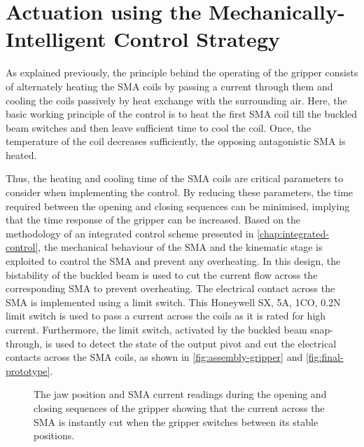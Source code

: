 \section{Actuation using the Mechanically-Intelligent Control Strategy}
As explained previously, the principle behind the operating of the gripper consists of alternately heating the SMA coils by passing a current through them and cooling the coils passively by heat exchange with the surrounding air. Here, the basic working principle of the control is to heat the first SMA coil till the buckled beam switches and then leave sufficient time to cool the coil. Once, the temperature of the coil decreases sufficiently, the opposing antagonistic SMA is heated.

Thus, the heating and cooling time of the SMA coils are critical parameters to consider when implementing the control. By reducing these parameters, the time required between the opening and closing sequences can be minimised, implying that the time response of the gripper can be increased. Based on the methodology of an integrated control scheme presented in \cref{chap:integrated-control}, the mechanical behaviour of the SMA and the kinematic stage is exploited to control the SMA and prevent any overheating. In this design, the bistability of the buckled beam is used to cut the current flow across the corresponding SMA to prevent overheating. The electrical contact across the SMA is implemented using a limit switch. This Honeywell SX, 5A, 1CO, 0.2N limit switch is used to pass a current across the coils as it is rated for high current. Furthermore, the limit switch, activated by the buckled beam snap-through, is used to detect the state of the output pivot and cut the electrical contacts across the SMA coils, as shown in \cref{fig:assembly-gripper} and \cref{fig:final-prototype}.
\begin{figure}[hbt!] %
    \centering
  \caption[The jaw position and SMA current readings during the opening and closing sequences of the gripper]{The jaw position and SMA current readings during the opening and closing sequences of the gripper showing that the current across the SMA is instantly cut when the gripper switches between its stable positions.}
  \label{fig:smabb-actuation}
\end{figure}

